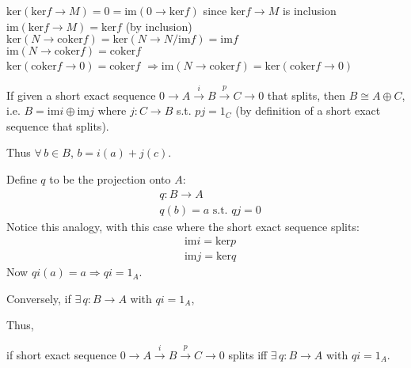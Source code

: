 \documentclass[twoside,landscape]{amsart}
\theoremstyle{plain}
\theoremstyle{definition}
\theoremstyle{remark}
\newcommand{\exercisehead}[1]
  { \smallskip
   \noindent{\small\bf Exercise #1.}
  }
\begin{document}
\begin{multicols*}{2}
\begin{enumerate}
$\text{ker}(\text{ker}f \to M) = 0 = \text{im}(0\to \text{ker}f)$ since $\text{ker}f \to M$ is inclusion \\
$\text{im}(\text{ker}f\to M) = \text{ker}f$ (by inclusion) \\
$\text{ker}(N\to \text{coker}f) = \text{ker}(N\to N/\text{im}f) = \text{im}f$ \\
$\text{im}(N\to \text{coker}f) = \text{coker}f$ \\
$\text{ker}(\text{coker}f\to 0)=\text{coker}f$ $\Longrightarrow \text{im}(N\to \text{coker}f) = \text{ker}(\text{coker}f \to 0)$
\end{enumerate}


\exercisehead{7.17} 

If given a short exact sequence $0 \to A \xrightarrow{i} B \xrightarrow{p} C \to 0$ that splits, then $B \cong A\oplus C$, i.e. $B = \text{im}i \oplus \text{im}j$ where $j:C\to B$ s.t. $pj=1_C$ (by definition of a short exact sequence that splits).  

Thus $\forall \, b \in B$, $b = i(a) + j(c)$.  

Define $q$ to be the projection onto $A$: 
\[
\begin{aligned}
  & q: B \to A \\ 
  & q(b) = a \text{ s.t. } qj =0
\end{aligned}
\]
Notice this analogy, with this case where the short exact sequence splits:
\[
\begin{aligned}
  & \text{im}i = \text{ker}p \\ 
  &  \text{im}j = \text{ker}q
\end{aligned}
\]
Now $qi(a) = a \Longrightarrow qi = 1_A$.  

Conversely, if $\exists \, q : B \to A$ with $qi = 1_A$, 



Thus,

if short exact sequence $0 \to A \xrightarrow{i} B \xrightarrow{p} C \to 0$ splits iff $\exists \, q:B \to A$ with $qi=1_A$.  




\end{multicols*}
\end{document}
